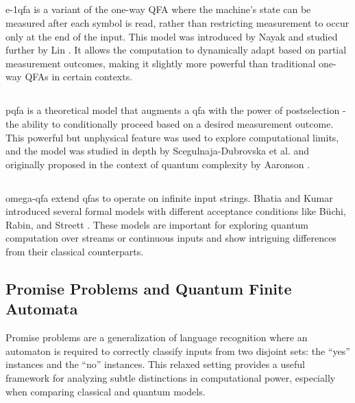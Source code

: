 \subsection{} 
\gls{e-1qfa} is a variant of the one-way QFA where the machine's state can be measured after each symbol is read, rather than restricting measurement to occur only at the end of the input. This model was introduced by Nayak \cite{nayak1999optimal} and studied further by Lin \cite{lin2012another}. It allows the computation to dynamically adapt based on partial measurement outcomes, making it slightly more powerful than traditional one-way QFAs in certain contexts.

\subsection{} 
\gls{pqfa} is a theoretical model that augments a \gls{qfa} with the power of postselection - the ability to conditionally proceed based on a desired measurement outcome. This powerful but unphysical feature was used to explore computational limits, and the model was studied in depth by Scegulnaja-Dubrovska et al. \cite{scegulnaja2010postselection} and originally proposed in the context of quantum complexity by Aaronson \cite{aaronson2005quantum}.

\subsection{}
\gls{omega-qfa} extend \glspl{qfa} to operate on infinite input strings. Bhatia and Kumar introduced several formal models with different acceptance conditions like Büchi, Rabin, and Streett \cite{bhatia2019quantum}. These models are important for exploring quantum computation over streams or continuous inputs and show intriguing differences from their classical counterparts.

\subsection{Promise Problems and Quantum Finite Automata}

Promise problems are a generalization of language recognition where an automaton is required to correctly classify inputs from two disjoint sets: the “yes” instances and the “no” instances. This relaxed setting provides a useful framework for analyzing subtle distinctions in computational power, especially when comparing classical and quantum models.

